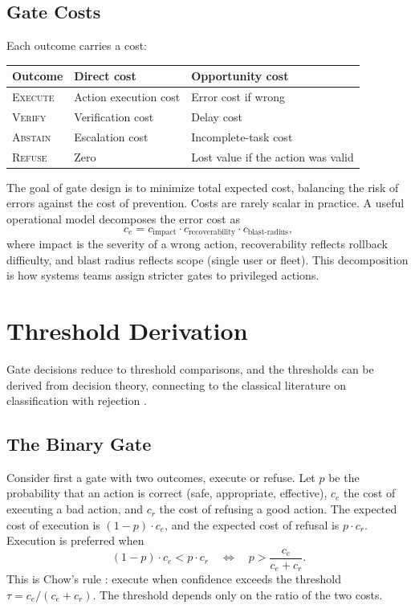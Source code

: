 \documentclass[11pt]{book}
\begin{document}
\subsection{Gate Costs}

Each outcome carries a cost:

\begin{center}
\begin{tabular}{lll}
\toprule
Outcome & Direct cost & Opportunity cost \\
\midrule
\textsc{Execute} & Action execution cost & Error cost if wrong \\
\textsc{Verify} & Verification cost & Delay cost \\
\textsc{Abstain} & Escalation cost & Incomplete-task cost \\
\textsc{Refuse} & Zero & Lost value if the action was valid \\
\bottomrule
\end{tabular}
\end{center}

The goal of gate design is to minimize total expected cost, balancing the risk of errors against the cost of prevention. Costs are rarely scalar in practice. A useful operational model decomposes the error cost as
\[
c_e = c_{\text{impact}} \cdot c_{\text{recoverability}} \cdot c_{\text{blast-radius}},
\]
where impact is the severity of a wrong action, recoverability reflects rollback difficulty, and blast radius reflects scope (single user or fleet). This decomposition is how systems teams assign stricter gates to privileged actions.

\section{Threshold Derivation}

Gate decisions reduce to threshold comparisons, and the thresholds can be derived from decision theory, connecting to the classical literature on classification with rejection \cite{chow1970optimum, cortes2016learning}.

\subsection{The Binary Gate}

Consider first a gate with two outcomes, execute or refuse. Let $p$ be the probability that an action is correct (safe, appropriate, effective), $c_e$ the cost of executing a bad action, and $c_r$ the cost of refusing a good action. The expected cost of execution is $(1-p) \cdot c_e$, and the expected cost of refusal is $p \cdot c_r$. Execution is preferred when
\[
(1-p) \cdot c_e < p \cdot c_r \quad \Longleftrightarrow \quad p > \frac{c_e}{c_e + c_r}.
\]
This is Chow's rule \cite{chow1970optimum}: execute when confidence exceeds the threshold $\tau = c_e/(c_e + c_r)$. The threshold depends only on the ratio of the two costs.
\end{document}
